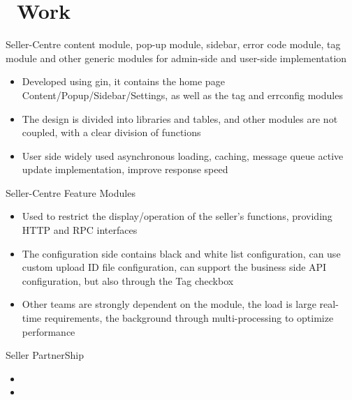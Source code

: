 \documentclass{resume}
\newcommand{\en}[1]{#1}
\newcommand{\zh}[1]{}
\begin{document}
\section{\faGithubAlt\ \en{Work}\zh{工作项目}}
\en{Seller-Centre content module, pop-up module, sidebar, error code module, tag module and other generic modules for admin-side and user-side implementation}
\zh{Seller-Centre 首页}
\begin{itemize}
      \item \en{Developed using gin, it contains the home page Content/Popup/Sidebar/Settings, as well as the tag and errconfig modules}
            \zh{项目 owner,使用 gin 开发,包含首页内容、弹窗、侧边栏、错误码、标签等模块}
      \item \en{The design is divided into libraries and tables, and other modules are not coupled, with a clear division of functions}
            \zh{数据上分库分表,设计上功能划分清晰,业务拓展性强}
      \item \en{User side widely used asynchronous loading, caching, message queue active update implementation, improve response speed}
            \zh{广泛使用异步加载、缓存、消息 等方式提高用户体验}
\end{itemize}

\en{Seller-Centre Feature Modules}
\zh{Seller-Centre Feature 模块}
\begin{itemize}
      \item \en{Used to restrict the display/operation of the seller's functions, providing HTTP and RPC interfaces}
            \zh{用于限制卖家的功能显示/操作,对外提供 HTTP 以及 RPC 查询接口}
      \item \en{The configuration side contains black and white list configuration, can use custom upload ID file configuration, can support the business side API configuration, but also through the Tag checkbox}
            \zh{配置端包含黑白名单配置,支持上传/勾选 Tag/API 等多种方式配置,有回滚/user 端通知/Tag 标记等功能}
      \item \en{Other teams are strongly dependent on the module, the load is large real-time requirements, the background through multi-processing to optimize performance}
            \zh{其它团队强依赖模块,负载大实时性要求强,后台通过多协程处理优化性能}
\end{itemize}

\en{Seller PartnerShip}
\zh{Seller PartnerShip}
\begin{itemize}
      \item \en{}
            \zh{项目 owner,独立完成后端设计与开发,项目需对接多个团队}
      \item \en{}
            \zh{使用 gin 开发,包含充值/兑换/券码/订单/用户/定时任务/邮件通知等模块}
\end{itemize}
\end{document}
